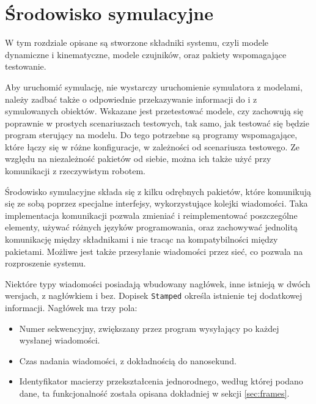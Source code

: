 \chapter{Środowisko symulacyjne}
\label{sec:model}
W tym rozdziale opisane są stworzone składniki systemu, czyli modele dynamiczne i kinematyczne, modele czujników, oraz pakiety wspomagające testowanie.

Aby uruchomić symulację, nie wystarczy uruchomienie symulatora z modelami, należy zadbać także o odpowiednie przekazywanie informacji do i z symulowanych obiektów.
Wskazane jest przetestować modele, czy zachowują się poprawnie w prostych scenariuszach testowych, tak samo, jak testować się będzie program sterujący na modelu.
Do tego potrzebne są programy wspomagające, które łączy się w różne konfiguracje, w zależności od scenariusza testowego.
Ze względu na niezależność pakietów od siebie, można ich także użyć przy komunikacji z rzeczywistym robotem.

Środowisko symulacyjne składa się z kilku odrębnych pakietów, które komunikują się ze sobą poprzez specjalne interfejsy, wykorzystujące kolejki wiadomości.
Taka implementacja komunikacji pozwala zmieniać i reimplementować poszczególne elementy, używać różnych języków programowania, oraz
zachowywać jednolitą komunikację między składnikami i nie tracąc na kompatybilności między pakietami.
Możliwe jest także przesyłanie wiadomości przez sieć, co pozwala na rozproszenie systemu.

Niektóre typy wiadomości posiadają wbudowany nagłówek, inne istnieją w dwóch wersjach, z nagłówkiem i bez. 
Dopisek \texttt{Stamped} określa istnienie tej dodatkowej informacji.
Nagłówek ma trzy pola:
\begin{itemize}
	\item Numer sekwencyjny, zwiększany przez program wysyłający po każdej wysłanej wiadomości.
	\item Czas nadania wiadomości, z dokładnością do nanosekund.
	\item Identyfikator macierzy przekształcenia jednorodnego, według której podano dane, ta funkcjonalność została opisana dokładniej w sekcji \ref{sec:frames}.
\end{itemize}

